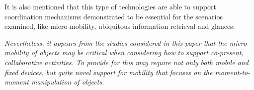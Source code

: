 It is also mentioned that this type of technologies are able to support coordination mechanisms demonstrated to be essential for the scenarios examined, like micro-mobility, ubiquitous information retrieval and glances:

\textit{Nevertheless, it appears from the studies considered in this paper that the micro-mobility of objects may be critical when considering how to support co-present, collaborative activities. To provide for this may require not only both mobile and fixed devices, but quite novel support for mobility that focuses on the moment-to-moment manipulation of objects.}

